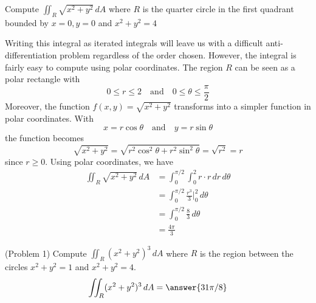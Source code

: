 \documentclass[handout]{ximera}
\begin{document}
\begin{example}[Example 1]
Compute $\iint_R \sqrt{x^2 + y^2} \, dA$ where $R$ is the quarter circle in the first quadrant bounded by $x=0, y=0$ and $x^2 + y^2 = 4$\\

\begin{image}
\end{image}
Writing this integral as iterated integrals will leave us with a difficult anti-differentiation problem regardless of the order chosen.
However, the integral is fairly easy to compute using polar coordinates. The region $R$ can be seen as a polar rectangle with 
\[
0\leq r \leq 2 \quad \text{and} \quad 0 \leq \theta \leq \frac{\pi}{2}
\]
Moreover, the function $f(x,y) = \sqrt{x^2 + y^2}$ transforms into a simpler function in polar coordinates. With
\[
x = r\cos \theta \quad \text{and} \quad y = r\sin \theta
\]
the function becomes
\[
\sqrt{x^2 +y^2} = \sqrt{r^2 \cos^2 \theta + r^2 \sin^2 \theta} = \sqrt{r^2} = r
\]
since $r \geq 0$.
Using polar coordinates, we have
\begin{align*}
\iint_R \sqrt{x^2 + y^2} \, dA & = \int_0^{\pi/2} \int_0^2 r \cdot r \, dr \, d\theta\\
                 & = \int_0^{\pi/2}  \frac{r^3}{3} \bigg|_{0}^2 \, d\theta\\
                 & = \int_0^{\pi/2} \frac83\, d\theta\\
                 &= \frac{4\pi}{3}
\end{align*}  

\end{example}

\begin{problem}(Problem 1)
Compute $\iint_R (x^2 + y^2)^3 \, dA$ where $R$ is the region between the circles $x^2 + y^2 = 1$ and $x^2 + y^2 = 4$.\\
\[
\iint_R (x^2 + y^2)^3 \, dA = \answer{31\pi/8}
\]
\end{problem}
\end{document}
